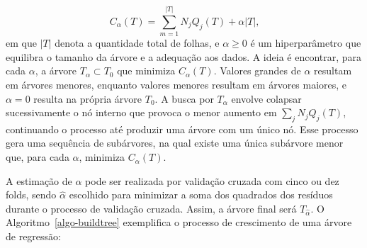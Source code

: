 \documentclass[
  12pt,
  a4paper,
]{scrreprt}
\begin{document}
\[
C_{\alpha}\left(T\right) = \sum_{m = 1}^{|T|}N_jQ_j\left(T\right) + \alpha |T|\text{,}
\] em que \(|T|\) denota a quantidade total de folhas, e
\(\alpha \geq 0\) é um hiperparâmetro que equilibra o tamanho da árvore
e a adequação aos dados. A ideia é encontrar, para cada \(\alpha\), a
árvore \(T_{\alpha} \subset T_0\) que minimiza
\(C_{\alpha}\left(T\right)\). Valores grandes de \(\alpha\) resultam em
árvores menores, enquanto valores menores resultam em árvores maiores, e
\(\alpha = 0\) resulta na própria árvore \(T_0\). A busca por
\(T_{\alpha}\) envolve colapsar sucessivamente o nó interno que provoca
o menor aumento em \(\sum_j N_j Q_j\left(T\right)\), continuando o
processo até produzir uma árvore com um único nó. Esse processo gera uma
sequência de subárvores, na qual existe uma única subárvore menor que,
para cada \(\alpha\), minimiza \(C_{\alpha}\left(T\right)\).

\vspace{12pt}

A estimação de \(\alpha\) pode ser realizada por validação cruzada com
cinco ou dez folds, sendo \(\hat \alpha\) escolhido para minimizar a
soma dos quadrados dos resíduos durante o processo de validação cruzada.
Assim, a árvore final será \(T_{\hat \alpha}\). O
 Algoritmo~\ref{algo-buildtree}  exemplifica o processo de crescimento
de uma árvore de regressão:
\end{document}
